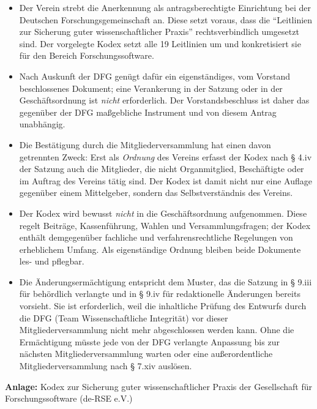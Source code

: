 \documentclass[a4paper, fontsize=11pt]{scrartcl}
\begin{document}
\begin{itemize}
  \item Der Verein strebt die Anerkennung als antragsberechtigte Einrichtung bei der Deutschen Forschungsgemeinschaft an. Diese setzt voraus, dass die \enquote{Leitlinien zur Sicherung guter wissenschaftlicher Praxis} rechtsverbindlich umgesetzt sind. Der vorgelegte Kodex setzt alle 19 Leitlinien um und konkretisiert sie für den Bereich Forschungssoftware.
  \item Nach Auskunft der DFG genügt dafür ein eigenständiges, vom Vorstand beschlossenes Dokument; eine Verankerung in der Satzung oder in der Geschäftsordnung ist \emph{nicht} erforderlich. Der Vorstandsbeschluss ist daher das gegenüber der DFG maßgebliche Instrument und von diesem Antrag unabhängig.
  \item Die Bestätigung durch die Mitgliederversammlung hat einen davon getrennten Zweck: Erst als \emph{Ordnung} des Vereins erfasst der Kodex nach § 4.iv der Satzung auch die Mitglieder, die nicht Organmitglied, Beschäftigte oder im Auftrag des Vereins tätig sind. Der Kodex ist damit nicht nur eine Auflage gegenüber einem Mittelgeber, sondern das Selbstverständnis des Vereins.
  \item Der Kodex wird bewusst \emph{nicht} in die Geschäftsordnung aufgenommen. Diese regelt Beiträge, Kassenführung, Wahlen und Versammlungsfragen; der Kodex enthält demgegenüber fachliche und verfahrensrechtliche Regelungen von erheblichem Umfang. Als eigenständige Ordnung bleiben beide Dokumente les- und pflegbar.
  \item Die Änderungsermächtigung entspricht dem Muster, das die Satzung in § 9.iii für behördlich verlangte und in § 9.iv für redaktionelle Änderungen bereits vorsieht. Sie ist erforderlich, weil die inhaltliche Prüfung des Entwurfs durch die DFG (Team Wissenschaftliche Integrität) vor dieser Mitgliederversammlung nicht mehr abgeschlossen werden kann. Ohne die Ermächtigung müsste jede von der DFG verlangte Anpassung bis zur nächsten Mitgliederversammlung warten oder eine außerordentliche Mitgliederversammlung nach § 7.xiv auslösen.
\end{itemize}


\vspace{1em}
\noindent\small \textbf{Anlage:} Kodex zur Sicherung guter wissenschaftlicher Praxis der Gesellschaft für Forschungssoftware (de-RSE e.V.)
\end{document}
